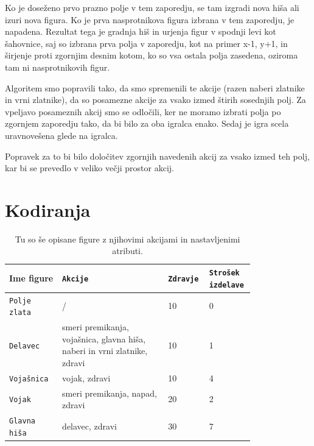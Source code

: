 \documentclass[a4paper, 12pt]{book}
\begin{document}
Ko je doseženo prvo prazno polje v tem zaporedju, se tam izgradi nova hiša ali izuri nova figura.
Ko je prva nasprotnikova figura izbrana v tem zaporedju, je napadena.
Rezultat tega je gradnja hiš in urjenja figur v spodnji levi kot šahovnice, saj so izbrana prva polja v zaporedju, kot na primer x-1, y+1, in širjenje proti zgornjim desnim kotom, ko so vsa ostala polja zasedena, oziroma tam ni nasprotnikovih figur.

Algoritem smo popravili tako, da smo spremenili te akcije (razen naberi zlatnike in vrni zlatnike), da so posamezne akcije za vsako izmed štirih sosednjih polj.
Za vpeljavo posameznih akcij smo se odločili, ker ne moramo izbrati polja po zgornjem zaporedju tako, da bi bilo za oba igralca enako.
Sedaj je igra scela uravnovešena glede na igralca.

Popravek za to bi bilo določitev zgornjih navedenih akcij za vsako izmed teh polj, kar bi se prevedlo v veliko večji prostor akcij.

\section{Kodiranja}
\label{kodiranja}
\begin{table}

	\begin{center}
		
	\begin{tabular}{p{0.2\linewidth}|p{0.4\linewidth}|p{0.1\linewidth}|p{0.1\linewidth}}
		Ime figure          & {\tt Akcije}                                                              & {\tt Zdravje} & {\tt Strošek izdelave} \\ \hline
		{\tt Polje zlata}   & /                                                                         & 10            & 0 \\
		{\tt Delavec}       & smeri premikanja, vojašnica, glavna hiša, naberi in vrni zlatnike, zdravi & 10            & 1 \\
		{\tt Vojašnica}     & vojak, zdravi                                                             & 10            & 4 \\
		{\tt Vojak}         & smeri premikanja, napad, zdravi                                           & 20            & 2 \\
		{\tt Glavna hiša}   & delavec, zdravi                                                           & 30            & 7 \\
	\end{tabular}
	\end{center}
	\caption{Tu so še opisane figure z njihovimi akcijami in nastavljenimi atributi.}
	\label{tabelfigures}
\end{table}
\end{document}
